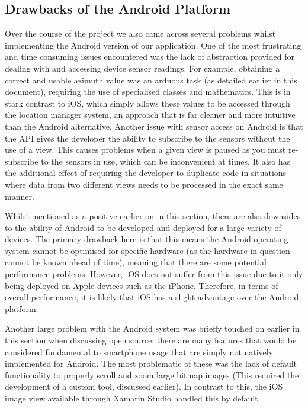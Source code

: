 \documentclass[main.tex]{subfiles}
\begin{document}
        \subsection{Drawbacks of the Android Platform}
            Over the course of the project we also came across several problems whilst implementing the Android version of our application. One of the most frustrating and time
            consuming issues encountered was the lack of abstraction provided for dealing with and accessing device sensor readings. For example, obtaining a correct and usable
            azimuth value was an arduous task (as detailed earlier in this document), requiring the use of specialised classes and mathematics. This is in stark contrast to iOS, which
            simply allows these values to be accessed through the location manager system, an approach that is far cleaner and more intuitive than the Android alternative. Another issue
            with sensor access on Android is that the API gives the developer the ability to subscribe to the sensors without the use of a view. This causes problems when a given view is
            paused as you must re-subscribe to the sensors in use, which can be inconvenient at times. It also has the additional effect of requiring the developer to duplicate code in
            situations where data from two different views needs to be processed in the exact same manner.
            
            Whilst mentioned as a positive earlier on in this section, there are also downsides to the ability of Android to be developed and deployed for a large variety of devices. The 
            primary drawback here is that this means the Android operating system cannot be optimised for specific hardware (as the hardware in question cannot be known ahead 
            of time), meaning that there are some potential performance problems. However, iOS does not suffer from this issue due to it only being deployed on Apple devices such as
            the iPhone. Therefore, in terms of overall performance, it is likely that iOS has a slight advantage over the Android platform.
            
            Another large problem with the Android system was briefly touched on earlier in this section when discussing open source: there are many features that would be considered
            fundamental to smartphone usage that are simply not natively implemented for Android. The most problematic of these was the lack of default functionality to properly
            scroll and zoom large bitmap images (This required the development of a custom tool, discussed earlier). In contrast to this, the iOS image view available through
            Xamarin Studio handled this by default.
            
\end{document}
